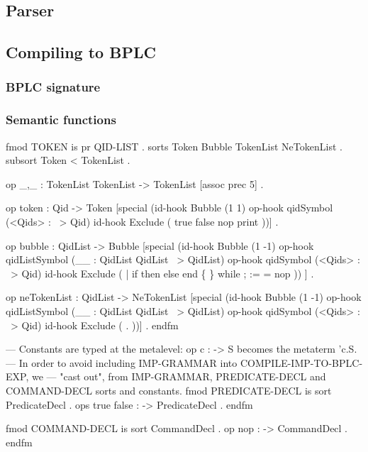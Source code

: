 \documentclass{llncs}%
\begin{document}
\subsection{Parser}

\subsection{Compiling to BPLC}

\subsubsection{BPLC signature}

\subsubsection{Semantic functions}


\endmoddef\nwstartdeflinemarkup\nwenddeflinemarkup
fmod TOKEN is
    pr QID-LIST .
    sorts Token Bubble TokenList NeTokenList .
    subsort Token < TokenList .

    op _,_ : TokenList TokenList -> TokenList [assoc prec 5] .

    op token : Qid -> Token
       [special
         (id-hook Bubble        (1 1)
          op-hook qidSymbol     (<Qids> : ~> Qid)
              id-hook Exclude       ( true false nop print ))] .

    op bubble : QidList -> Bubble
       [special
         (id-hook Bubble        (1 -1)
          op-hook qidListSymbol (__ : QidList QidList ~> QidList)
          op-hook qidSymbol     (<Qids> : ~> Qid)
              id-hook Exclude       ( | if then else end \{ \} while ; := = nop )) ] .

    op neTokenList : QidList -> NeTokenList
       [special
         (id-hook Bubble        (1 -1)
          op-hook qidListSymbol (__ : QidList QidList ~> QidList)
          op-hook qidSymbol     (<Qids> : ~> Qid)
          id-hook Exclude       ( . ))] .
endfm

--- Constants are typed at the metalevel: op c : -> S becomes the metaterm 'c.S.
--- In order to avoid including IMP-GRAMMAR into COMPILE-IMP-TO-BPLC-EXP, we
--- "cast out", from IMP-GRAMMAR, PREDICATE-DECL and COMMAND-DECL sorts and constants.
fmod PREDICATE-DECL is
        sort PredicateDecl .
    ops true false : -> PredicateDecl .
endfm

fmod COMMAND-DECL is
        sort CommandDecl .
        op nop : -> CommandDecl .
endfm
\end{document}
